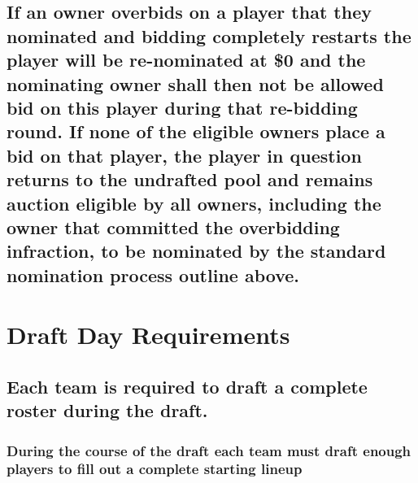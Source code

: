 \documentclass[]{book}
\begin{document}
\hypertarget{if-an-owner-overbids-on-a-player-that-they-nominated-and-bidding-completely-restarts-the-player-will-be-re-nominated-at-0-and-the-nominating-owner-shall-then-not-be-allowed-bid-on-this-player-during-that-re-bidding-round.-if-none-of-the-eligible-owners-place-a-bid-on-that-player-the-player-in-question-returns-to-the-undrafted-pool-and-remains-auction-eligible-by-all-owners-including-the-owner-that-committed-the-overbidding-infraction-to-be-nominated-by-the-standard-nomination-process-outline-above.}{%
\subsection{If an owner overbids on a player that they nominated and bidding completely restarts the player will be re-nominated at \$0 and the nominating owner shall then not be allowed bid on this player during that re-bidding round. If none of the eligible owners place a bid on that player, the player in question returns to the undrafted pool and remains auction eligible by all owners, including the owner that committed the overbidding infraction, to be nominated by the standard nomination process outline above.}\label{if-an-owner-overbids-on-a-player-that-they-nominated-and-bidding-completely-restarts-the-player-will-be-re-nominated-at-0-and-the-nominating-owner-shall-then-not-be-allowed-bid-on-this-player-during-that-re-bidding-round.-if-none-of-the-eligible-owners-place-a-bid-on-that-player-the-player-in-question-returns-to-the-undrafted-pool-and-remains-auction-eligible-by-all-owners-including-the-owner-that-committed-the-overbidding-infraction-to-be-nominated-by-the-standard-nomination-process-outline-above.}}

\hypertarget{draft-day-requirements}{%
\section{Draft Day Requirements}\label{draft-day-requirements}}

\hypertarget{each-team-is-required-to-draft-a-complete-roster-during-the-draft.}{%
\subsection{Each team is required to draft a complete roster during the draft.}\label{each-team-is-required-to-draft-a-complete-roster-during-the-draft.}}

\hypertarget{during-the-course-of-the-draft-each-team-must-draft-enough-players-to-fill-out-a-complete-starting-lineup}{%
\subsubsection{During the course of the draft each team must draft enough players to fill out a complete starting lineup}\label{during-the-course-of-the-draft-each-team-must-draft-enough-players-to-fill-out-a-complete-starting-lineup}}
\end{document}
